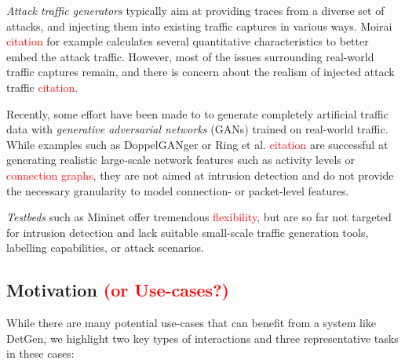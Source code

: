 \documentclass{article}
\begin{document}
\textit{Attack traffic generators} typically aim at providing traces from a diverse set of attacks, and injecting them into existing traffic captures in various ways. Moirai \textcolor{red}{citation} for example calculates several quantitative characteristics to better embed the attack traffic.  However, most of the issues surrounding real-world traffic captures remain, and there is concern about the realism of injected attack traffic \textcolor{red}{citation}.

Recently, some effort have been made to to generate completely artificial traffic data with \textit{generative adversarial networks} (GANs) trained on real-world traffic. While examples such as DoppelGANger or Ring et al. \textcolor{red}{citation} are successful at generating realistic large-scale network features such as activity levels or \textcolor{red}{connection graphs}, they are not aimed at intrusion detection and do not provide the necessary granularity to model connection- or packet-level features.

 \textit{Testbeds} such as Mininet offer tremendous \textcolor{red}{flexibility}, but are so far not targeted for intrusion detection and lack suitable small-scale traffic generation tools, labelling capabilities, or attack scenarios. 

\subsection{Motivation \textcolor{red}{(or Use-cases?)}}

While there are many potential use-cases that can benefit from a system like DetGen, we highlight two key types of interactions and three representative tasks in these cases: 
\end{document}
